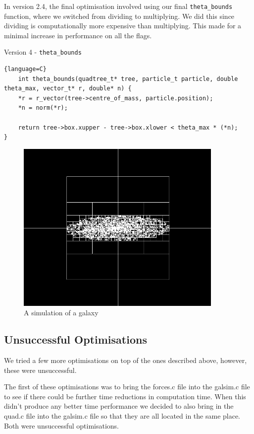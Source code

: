 In version 2.4, the final optimisation involved using our final \verb|theta_bounds| function, where we switched from dividing to multiplying. We did this since dividing is computationally more expensive than multiplying. This made for a minimal increase in performance on all the flags.
\begin{center}
    Version 4 - \verb|theta_bounds|
\end{center}
\begin{lstlisting}{language=C}
    int theta_bounds(quadtree_t* tree, particle_t particle, double theta_max, vector_t* r, double* n) {
    *r = r_vector(tree->centre_of_mass, particle.position);
    *n = norm(*r);

    return tree->box.xupper - tree->box.xlower < theta_max * (*n);
}
\end{lstlisting}
\begin{figure}[htb]
    \begin{center}
        \includegraphics[width = 10cm]{../images/squarespace.png}
        \caption{A simulation of a galaxy}
    \end{center}
\end{figure}
\newpage
\subsection{Unsuccessful Optimisations}
We tried a few more optimisations on top of the ones described above, however, these were unsuccessful.

The first of these optimisations was to bring the forces.c file into the galsim.c file to see if there could be further time reductions in computation time. When this didn't produce any better time performance we decided to also bring in the quad.c file into the galsim.c file so that they are all located in the same place. Both were unsuccessful optimisations.
\newpage
